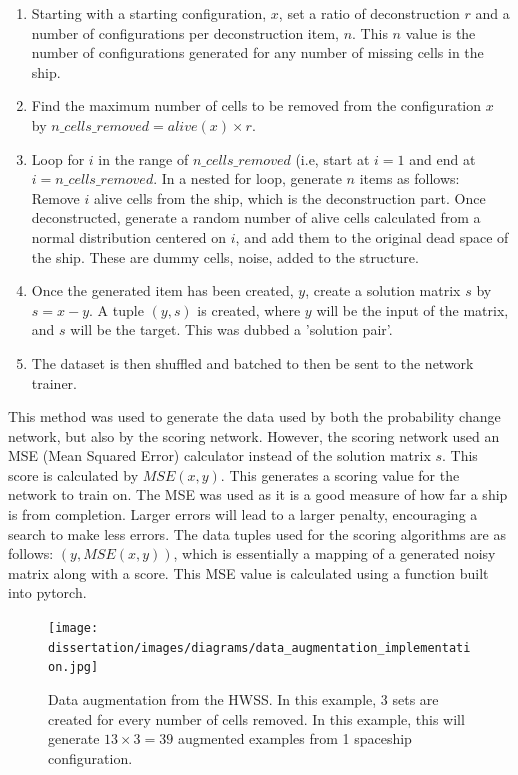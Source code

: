 \documentclass{l4proj}
\begin{document}
\begin{enumerate}
    \item Starting with a starting configuration, $x$, set a ratio of deconstruction $r$ and a number of configurations per deconstruction item, $n$. This $n$ value is the number of configurations generated for any number of missing cells in the ship.
    \item Find the maximum number of cells to be removed from the configuration $x$ by $n\_cells\_removed = alive(x) \times r$.
    \item Loop for $i$ in the range of $n\_cells\_removed$ (i.e, start at $i=1$ and end at $i = n\_cells\_removed$. In a nested for loop, generate $n$ items as follows: Remove $i$ alive cells from the ship, which is the deconstruction part. Once deconstructed, generate a random number of alive cells calculated from a normal distribution centered on $i$, and add them to the original dead space of the ship. These are dummy cells, noise, added to the structure.
    \item Once the generated item has been created, $y$, create a solution matrix $s$ by $s = x - y$. A tuple $(y, s)$ is created, where $y$ will be the input of the matrix, and $s$ will be the target. This was dubbed a 'solution pair'.
    \item The dataset is then shuffled and batched to then be sent to the network trainer.
\end{enumerate}

This method was used to generate the data used by both the probability change network, but also by the scoring network. However, the scoring network used an MSE (Mean Squared Error) calculator instead of the solution matrix $s$. This score is calculated by $MSE(x, y)$. This generates a scoring value for the network to train on. The MSE was used as it is a good measure of how far a ship is from completion. Larger errors will lead to a larger penalty, encouraging a search to make less errors. The data tuples used for the scoring algorithms are as follows: $(y, MSE(x, y))$, which is essentially a mapping of a generated noisy matrix along with a score. This MSE value is calculated using a function built into pytorch.

\begin{figure}[h!]
\centering
\texttt{[image: dissertation/images/diagrams/data\_augmentation\_implementation.jpg]}
\caption{Data augmentation from the HWSS. In this example, 3 sets are created for every number of cells removed. In this example, this will generate $13 \times 3 = 39$ augmented examples from 1 spaceship configuration.}
\label{fig:subim1}
\end{figure}
\end{document}
